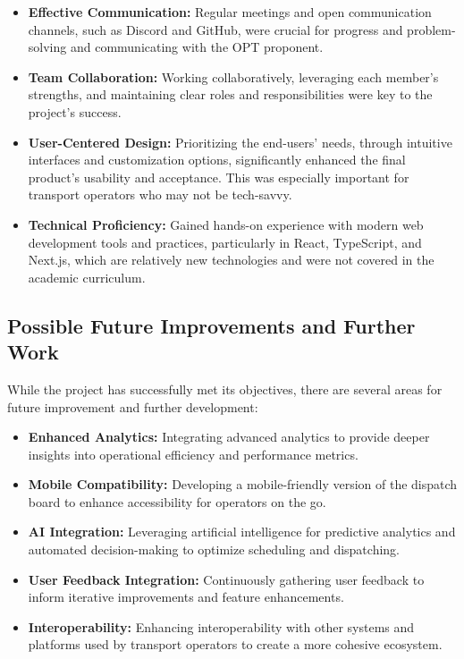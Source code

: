 \documentclass[10pt]{article}
\begin{document}
         \begin{itemize}
             \item \textbf{Effective Communication:} Regular meetings and open communication channels, such as Discord and GitHub, were crucial for progress and problem-solving and communicating with the OPT proponent.
             \item \textbf{Team Collaboration:} Working collaboratively, leveraging each member's strengths, and maintaining clear roles and responsibilities were key to the project's success.
             \item \textbf{User-Centered Design:} Prioritizing the end-users' needs, through intuitive interfaces and customization options, significantly enhanced the final product's usability and acceptance. This was especially important for transport operators who may not be tech-savvy.
             \item \textbf{Technical Proficiency:} Gained hands-on experience with modern web development tools and practices, particularly in React, TypeScript, and Next.js, which are relatively new technologies and were not covered in the academic curriculum.
         \end{itemize}


         \subsection{Possible Future Improvements and Further Work}

         While the project has successfully met its objectives, there are several areas for future improvement and further development:

         \begin{itemize}
             \item \textbf{Enhanced Analytics:} Integrating advanced analytics to provide deeper insights into operational efficiency and performance metrics.
             \item \textbf{Mobile Compatibility:} Developing a mobile-friendly version of the dispatch board to enhance accessibility for operators on the go.
             \item \textbf{AI Integration:} Leveraging artificial intelligence for predictive analytics and automated decision-making to optimize scheduling and dispatching.
             \item \textbf{User Feedback Integration:} Continuously gathering user feedback to inform iterative improvements and feature enhancements.
             \item \textbf{Interoperability:} Enhancing interoperability with other systems and platforms used by transport operators to create a more cohesive ecosystem.
         \end{itemize}
\end{document}
